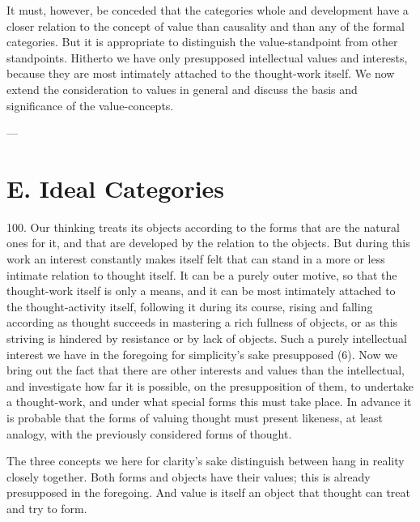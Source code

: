 \documentclass[12pt,a4paper]{book}
\newcommand{\opage}[1]{\marginnote{\footnotesize\textit{[#1]}}}
\begin{document}
It must, however, be conceded that the categories whole and development have a
closer relation to the concept of value than causality and than any of the
formal categories. But it is appropriate to distinguish the value-standpoint
from other standpoints. Hitherto we have only presupposed intellectual values
and interests, because they are most intimately attached to the thought-work
itself. We now extend the consideration to values in general and discuss the
basis and significance of the value-concepts.

\begin{center}---\end{center}

\section*{E. Ideal Categories}
\label{sec:ideale-kategorier}

100. Our thinking treats its objects according to the forms that are the
natural ones for it, and that are developed by the relation to the objects.
But during this work an interest constantly makes itself felt that can stand
in a more or less intimate relation to thought itself. It can be a purely
outer motive, so that the thought-work itself is only a means, and it can be
most intimately attached to the thought-activity itself, following it during
its course, rising and falling according as thought succeeds in mastering a
rich fullness of objects, or as this striving is hindered by resistance or by
lack of objects. Such a purely intellectual interest we have in the foregoing
for simplicity's sake presupposed (6). Now we bring out the fact that there
are other interests and values than the intellectual, and investigate how far
it is possible, on the presupposition of them, to undertake a thought-work,
and under what \opage{238}special forms this must take place. In advance it is probable
that the forms of valuing thought must present likeness, at least analogy,
with the previously considered forms of thought.

The three concepts we here for clarity's sake distinguish between hang in
reality closely together. Both forms and objects have their values; this is
already presupposed in the foregoing. And value is itself an object that
thought can treat and try to form.
\end{document}
